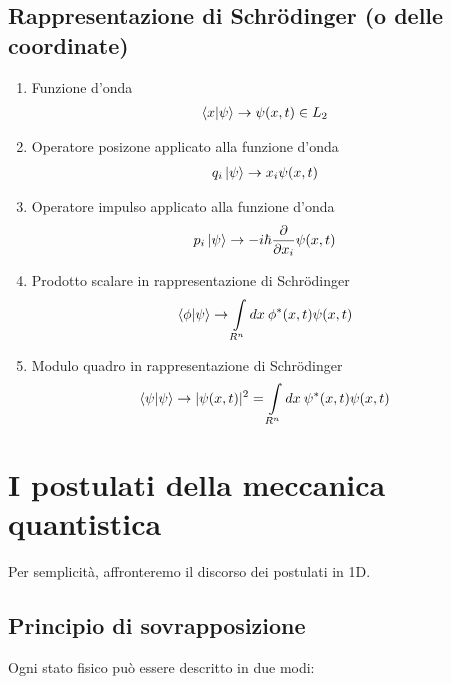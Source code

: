  \subsection{Rappresentazione di Schrödinger (o delle coordinate)}
 
 \begin{enumerate}
 	\item Funzione d'onda
 		 \begin{align}
 			\braket{x | \psi} &\rightarrow \psi(x,t) \in L_2
 		\end{align}
 	\item Operatore posizone applicato alla funzione d'onda
 		 \begin{align}
			q_i\ket{\psi} &\rightarrow x_i\psi(x,t)
 		\end{align}
 	\item Operatore impulso applicato alla funzione d'onda
		 \begin{align}
			p_i\ket{\psi} &\rightarrow -i\hbar \frac{\partial}{\partial x_i}  \psi(x,t)
		\end{align} 	
 	\item Prodotto scalare in rappresentazione di Schrödinger
 		 \begin{align}
	 			\braket{\phi | \psi} &\rightarrow \int \limits_{R^n} dx \: \phi^*(x,t)\psi(x,t) 
 		\end{align}
 	\item Modulo quadro in rappresentazione di Schrödinger
 		 \begin{align}
 			\braket{\psi | \psi} &\rightarrow |\psi(x,t)|^2 = \int \limits_{R^n} dx \: \psi^*(x,t)\psi(x,t)
 		\end{align}
 \end{enumerate}
 
\newpage

\section{I postulati della meccanica quantistica}

Per semplicità, affronteremo il discorso dei postulati in 1D. 

\subsection{Principio di sovrapposizione}
	Ogni stato fisico può essere descritto in due modi:
	
